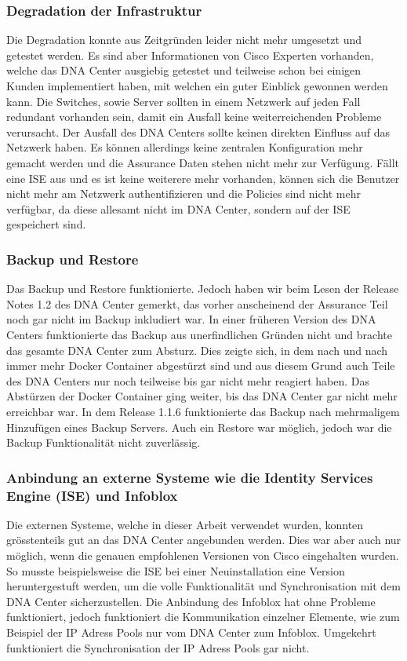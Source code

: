 \subsubsection{Degradation der Infrastruktur}
Die Degradation konnte aus Zeitgründen leider nicht mehr umgesetzt und getestet werden. Es sind aber Informationen von Cisco Experten vorhanden, welche das DNA Center ausgiebig getestet und teilweise schon bei einigen Kunden implementiert haben, mit welchen ein guter Einblick gewonnen werden kann. Die Switches, sowie Server sollten in einem Netzwerk auf jeden Fall redundant vorhanden sein, damit ein Ausfall keine weiterreichenden Probleme verursacht. Der Ausfall des DNA Centers sollte keinen direkten Einfluss auf das Netzwerk haben. Es können allerdings keine zentralen Konfiguration mehr gemacht werden und die Assurance Daten stehen nicht mehr zur Verfügung. Fällt eine ISE aus und es ist keine weiterere mehr vorhanden, können sich die Benutzer nicht mehr am Netzwerk authentifizieren und die Policies sind nicht mehr verfügbar, da diese allesamt nicht im DNA Center, sondern auf der ISE gespeichert sind.

\subsubsection{Backup und Restore}
Das Backup und Restore funktionierte. Jedoch haben wir beim Lesen der Release Notes 1.2 des DNA Center gemerkt, das vorher anscheinend der Assurance Teil noch gar nicht im Backup inkludiert war. In einer früheren Version des DNA Centers funktionierte das Backup aus unerfindlichen Gründen nicht und brachte das gesamte DNA Center zum Absturz. Dies zeigte sich, in dem nach und nach immer mehr Docker Container abgestürzt sind und aus diesem Grund auch Teile des DNA Centers nur noch teilweise bis gar nicht mehr reagiert haben. Das Abstürzen der Docker Container ging weiter, bis das DNA Center gar nicht mehr erreichbar war. In dem Release 1.1.6 funktionierte das Backup nach mehrmaligem Hinzufügen eines Backup Servers. Auch ein Restore war möglich, jedoch war die Backup Funktionalität nicht zuverlässig.

\subsubsection{Anbindung an externe Systeme wie die Identity Services Engine (ISE) und Infoblox}
Die externen Systeme, welche in dieser Arbeit verwendet wurden, konnten grösstenteils gut an das DNA Center angebunden werden. Dies war aber auch nur möglich, wenn die genauen empfohlenen Versionen von Cisco eingehalten wurden. So musste beispielsweise die ISE bei einer Neuinstallation eine Version heruntergestuft werden, um die volle Funktionalität und Synchronisation mit dem DNA Center sicherzustellen. Die Anbindung des Infoblox hat ohne Probleme funktioniert, jedoch funktioniert die Kommunikation einzelner Elemente, wie zum Beispiel der IP Adress Pools nur vom DNA Center zum Infoblox. Umgekehrt funktioniert die Synchronisation der IP Adress Pools gar nicht. 

